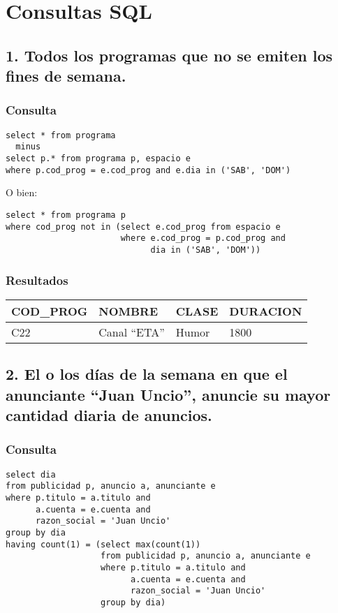 \section{Consultas SQL}


\subsection*{1. \normalsize{Todos los programas que no se emiten los fines de semana.}}

\subsubsection*{Consulta}
\begin{lstlisting} 
select * from programa
  minus
select p.* from programa p, espacio e
where p.cod_prog = e.cod_prog and e.dia in ('SAB', 'DOM')
\end{lstlisting}

O bien:

\begin{lstlisting} 
select * from programa p
where cod_prog not in (select e.cod_prog from espacio e 
                       where e.cod_prog = p.cod_prog and 
                             dia in ('SAB', 'DOM'))
\end{lstlisting}

\subsubsection*{Resultados}
\begin{tabular}{|l|l|l|l|}
  \hline
    \bf{COD\_PROG} & \bf{NOMBRE} & \bf{CLASE} & \bf{DURACION} \\ 
  \hline
    C22 & Canal ``ETA'' & Humor & 1800 \\ 
  \hline
\end{tabular} 

\subsection*{2. \normalsize{El o los d\'ias de la semana en que el anunciante ``Juan Uncio'', anuncie su mayor cantidad diaria de anuncios.}}

\subsubsection*{Consulta}
\begin{lstlisting}
select dia 
from publicidad p, anuncio a, anunciante e
where p.titulo = a.titulo and 
      a.cuenta = e.cuenta and 
      razon_social = 'Juan Uncio'
group by dia
having count(1) = (select max(count(1))
                   from publicidad p, anuncio a, anunciante e
                   where p.titulo = a.titulo and 
                         a.cuenta = e.cuenta and
                         razon_social = 'Juan Uncio'
                   group by dia)
\end{lstlisting}

